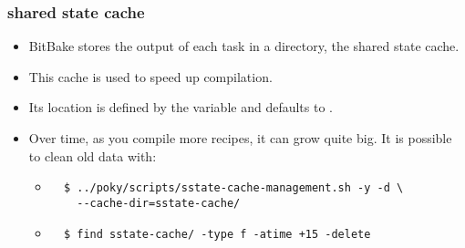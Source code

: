 \begin{frame}[fragile]
  \frametitle{shared state cache}
  \begin{itemize}
    \item BitBake stores the output of each task in a directory, the
      shared state cache.
    \item This cache is used to speed up compilation.
    \item Its location is defined by the  variable and
      defaults to .
    \item Over time, as you compile more recipes, it can grow quite
      big. It is possible to clean old data with:
      \begin{itemize}
        \item \begin{block}{}
          \begin{verbatim}
  $ ../poky/scripts/sstate-cache-management.sh -y -d \
    --cache-dir=sstate-cache/
          \end{verbatim}
        \end{block}
        \item \begin{block}{}
          \begin{verbatim}
  $ find sstate-cache/ -type f -atime +15 -delete
          \end{verbatim}
        \end{block}
      \end{itemize}
  \end{itemize}
\end{frame}
